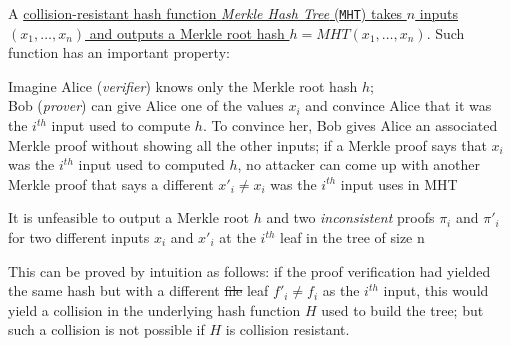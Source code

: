 A \ul{collision-resistant hash function \textit{Merkle Hash Tree} (\texttt{MHT}) takes $n$ inputs $(x_1,\dots,x_n)$ and outputs a Merkle root hash $h=MHT(x_1,\dots,x_n)$}. Such function has an important property:
\begin{center}
   Imagine Alice (\textit{verifier}) knows only the Merkle root hash $h$;\\
   Bob (\textit{prover}) can give Alice one of the values $x_i$ and convince Alice that it was the $i^{th}$ input used to compute $h$.
   To convince her, Bob gives Alice an associated Merkle proof without
   showing all the other inputs;
   if a Merkle proof says that $x_i$ was the $i^{th}$ input used to computed $h$, no attacker can come up with another Merkle proof that says a different $x'_i\neq x_i$ was the $i^{th}$ input uses in MHT
\end{center}
\begin{definition}
   It is unfeasible to output a Merkle root $h$ and two \textit{inconsistent} proofs $\pi_i$ and
   $\pi'_i$ for two different inputs $x_i$ and $x'_i$ at the $i^{th}$ leaf in the tree of size n
\end{definition}
This can be proved by intuition as follows:
if the proof verification had yielded the same hash but with a different \st{file} leaf
$f'_i\neq f_i$ as the $i^{th}$ input, this would yield a collision in the underlying hash function
$H$ used to build the tree; but such a collision is not possible if $H$ is collision resistant.

